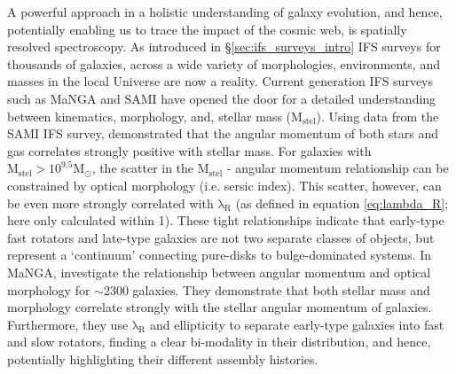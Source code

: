 A powerful approach in a holistic understanding of galaxy evolution, and hence, potentially enabling us to trace the impact of the cosmic web, is spatially resolved spectroscopy. As introduced in \S\ref{sec:ifs_surveys_intro} IFS surveys for thousands of galaxies, across a wide variety of morphologies, environments, and masses in the local Universe are now a reality. Current generation IFS surveys such as MaNGA and SAMI have opened the door for a detailed understanding between kinematics, morphology, and, stellar mass ($\mathrm{M_{stel}}$). Using data from the SAMI IFS survey, \citet{cortese2016} demonstrated that the angular momentum of both stars and gas correlates strongly positive with stellar mass. For galaxies with $\mathrm{M_{stel} > 10^{9.5} M_{\odot}}$, the scatter in the $\mathrm{M_{stel}}$ - angular momentum relationship can be constrained by optical morphology (i.e. sersic index). This scatter, however, can be even more strongly correlated with $\mathrm{\lambda_R}$ (as defined in equation \ref{eq:lambda_R}; here only calculated within 1\re). These tight relationships indicate that early-type fast rotators and late-type galaxies are not two separate classes of objects, but represent a `continuum' connecting pure-disks to bulge-dominated systems. In MaNGA, \citet{graham2018} investigate the relationship between angular momentum and optical morphology for $\sim$2300 galaxies. They demonstrate that both stellar mass and morphology correlate strongly with the stellar angular momentum of galaxies. Furthermore, they use $\mathrm{\lambda_R}$ and ellipticity to separate early-type galaxies into fast and slow rotators, finding a clear bi-modality in their distribution, and hence, potentially highlighting their different assembly histories. 

